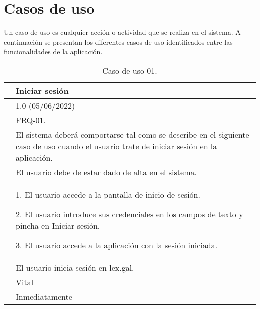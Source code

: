 \section{Casos de uso}

Un caso de uso \cite{casodeuso} es cualquier acción o actividad que se realiza en el sistema. A continuación se presentan los diferentes casos de uso identificados entre las funcionalidades de la aplicación.

\begin{table}[H]
\begin{center}
\begin{tabular}{|p{3cm}|p{10cm}|} \hline
\centering {\bf UC-01} & Iniciar sesión  \\ \hline\hline
\centering {\bf Versión} & 1.0 (05/06/2022) \\ \hline
\centering {\bf Dependencias} &  FRQ-01. \\ \hline
\centering {\bf Descripción} &  El sistema deberá comportarse tal como se describe en el siguiente caso de uso cuando el usuario trate de iniciar sesión en la aplicación. \\ \hline
\centering {\bf Precondición} &  El usuario debe de estar dado de alta en el sistema. \\ \hline
\centering {\bf Secuencia normal} &  
1. El usuario accede a la pantalla de inicio de sesión.

2. El usuario introduce sus credenciales en los campos de texto y pincha en Iniciar sesión.

3. El usuario accede a la aplicación con la sesión iniciada.
\\ \hline
\centering {\bf Postcondición} &  El usuario inicia sesión en lex.gal. \\ \hline
\centering {\bf Importancia} & Vital \\ \hline
\centering {\bf Urgencia} & Inmediatamente \\ \hline
\end{tabular}
\caption{Caso de uso 01.}
\label{enlaceUC1}
\end{center}
\end{table}

